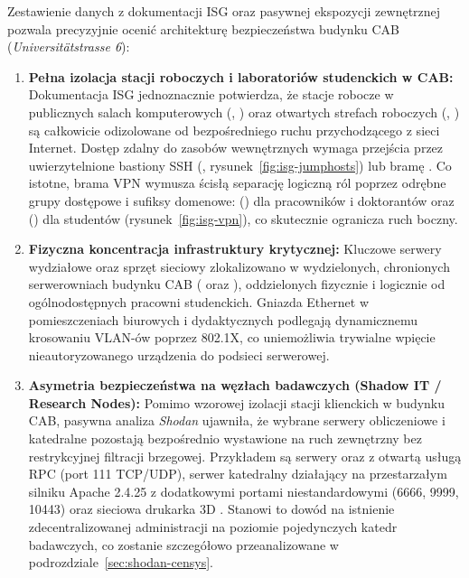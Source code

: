 Zestawienie danych z dokumentacji ISG oraz pasywnej ekspozycji zewnętrznej pozwala precyzyjnie ocenić architekturę bezpieczeństwa budynku CAB (\textit{Universitätstrasse 6}):
\begin{enumerate}
    \item \textbf{Pełna izolacja stacji roboczych i laboratoriów studenckich w CAB:} Dokumentacja ISG jednoznacznie potwierdza, że stacje robocze w publicznych salach komputerowych (, ) oraz otwartych strefach roboczych (, ) są całkowicie odizolowane od bezpośredniego ruchu przychodzącego z sieci Internet. Dostęp zdalny do zasobów wewnętrznych wymaga przejścia przez uwierzytelnione bastiony SSH (, rysunek~\ref{fig:isg-jumphosts}) lub bramę . Co istotne, brama VPN wymusza ścisłą separację logiczną ról poprzez odrębne grupy dostępowe i sufiksy domenowe:  () dla pracowników i doktorantów oraz  () dla studentów (rysunek~\ref{fig:isg-vpn}), co skutecznie ogranicza ruch boczny.
    \item \textbf{Fizyczna koncentracja infrastruktury krytycznej:} Kluczowe serwery wydziałowe oraz sprzęt sieciowy zlokalizowano w wydzielonych, chronionych serwerowniach budynku CAB ( oraz ), oddzielonych fizycznie i logicznie od ogólnodostępnych pracowni studenckich. Gniazda Ethernet w pomieszczeniach biurowych i dydaktycznych podlegają dynamicznemu krosowaniu VLAN-ów poprzez 802.1X, co uniemożliwia trywialne wpięcie nieautoryzowanego urządzenia do podsieci serwerowej.
    \item \textbf{Asymetria bezpieczeństwa na węzłach badawczych (Shadow IT / Research Nodes):} Pomimo wzorowej izolacji stacji klienckich w budynku CAB, pasywna analiza \textit{Shodan} ujawniła, że wybrane serwery obliczeniowe i katedralne pozostają bezpośrednio wystawione na ruch zewnętrzny bez restrykcyjnej filtracji brzegowej. Przykładem są serwery  oraz  z otwartą usługą RPC  (port 111 TCP/UDP), serwer katedralny  działający na przestarzałym silniku Apache 2.4.25 z dodatkowymi portami niestandardowymi (6666, 9999, 10443) oraz sieciowa drukarka 3D . Stanowi to dowód na istnienie zdecentralizowanej administracji na poziomie pojedynczych katedr badawczych, co zostanie szczegółowo przeanalizowane w podrozdziale~\ref{sec:shodan-censys}.
\end{enumerate}

